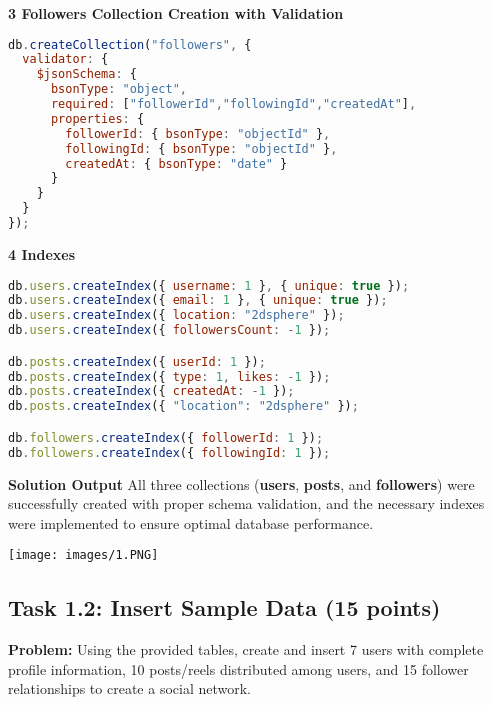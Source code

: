\documentclass[12pt,a4paper]{article}
\begin{document}
\begin{center}
\textbf{3 Followers Collection Creation with Validation}
\end{center}

\begin{lstlisting}[language=JavaScript]
db.createCollection("followers", {
  validator: {
    $jsonSchema: {
      bsonType: "object",
      required: ["followerId","followingId","createdAt"],
      properties: {
        followerId: { bsonType: "objectId" },
        followingId: { bsonType: "objectId" },
        createdAt: { bsonType: "date" }
      }
    }
  }
});
\end{lstlisting}

\begin{center}
\textbf{4 Indexes}
\end{center}

\begin{lstlisting}[language=JavaScript]
db.users.createIndex({ username: 1 }, { unique: true });
db.users.createIndex({ email: 1 }, { unique: true });
db.users.createIndex({ location: "2dsphere" });
db.users.createIndex({ followersCount: -1 });

db.posts.createIndex({ userId: 1 });
db.posts.createIndex({ type: 1, likes: -1 });
db.posts.createIndex({ createdAt: -1 });
db.posts.createIndex({ "location": "2dsphere" });

db.followers.createIndex({ followerId: 1 });
db.followers.createIndex({ followingId: 1 });
\end{lstlisting}
\textbf{Solution Output}
All three collections (\textbf{users}, \textbf{posts}, and \textbf{followers}) were successfully created with proper schema validation, and the necessary indexes were implemented to ensure optimal database performance.

\begin{center}
\texttt{[image: images/1.PNG]} 
\end{center}

\subsection{Task 1.2: Insert Sample Data (15 points)}
\textbf{Problem:} Using the provided tables, create and insert 7 users with complete profile information, 10 posts/reels distributed among users, and 15 follower relationships to create a social network.
\end{document}
